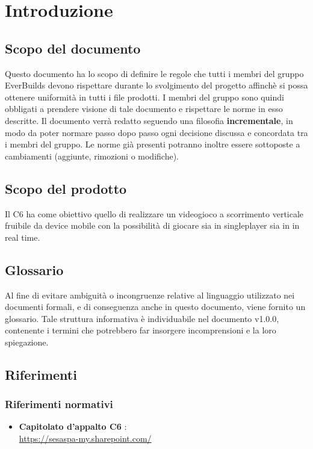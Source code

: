 \section{Introduzione}
    \subsection{Scopo del documento}
        Questo documento ha lo scopo di definire le regole che tutti i membri del gruppo EverBuilds devono rispettare durante lo svolgimento del progetto affinchè si possa ottenere uniformità in tutti i file prodotti.
        I membri del gruppo sono quindi obbligati a prendere visione di tale documento e rispettare le norme in esso descritte.
        Il documento verrà redatto seguendo una filosofia \textbf{incrementale}, in modo da poter normare passo dopo passo ogni decisione discussa e concordata tra i membri del gruppo. Le norme già presenti potranno inoltre essere sottoposte a cambiamenti (aggiunte, rimozioni o modifiche).
    \subsection{Scopo del prodotto}
        Il  C6 ha come obiettivo quello di realizzare un videogioco a scorrimento verticale fruibile da device mobile con la possibilità di giocare sia in singleplayer sia in  in real time. 
    \subsection{Glossario}
        Al fine di evitare ambiguità o incongruenze relative al linguaggio utilizzato nei documenti formali, e di conseguenza anche in questo documento, viene fornito un glossario. Tale struttura informativa è individuabile nel documento  v1.0.0, contenente i termini che potrebbero far insorgere incomprensioni e la loro spiegazione.
    \subsection{Riferimenti}
        \subsubsection{Riferimenti normativi}
            \begin{itemize}
                \item\textbf{Capitolato d'appalto C6} : \\
                \href{https://sesaspa-my.sharepoint.com/personal/s_dindo_vargroup_it/_layouts/15/onedrive.aspx?id=\%2Fpersonal\%2Fs\%5Fdindo\%5Fvargroup\%5Fit\%2FDocuments\%2FDownload\%2Fupload\%2FIngegneria\%5Fsoftware\%2FCapitolato\%5FIngegneria\%5Fsoftware\%2Epdf&parent=\%2Fpersonal\%2Fs\%5Fdindo\%5Fvargroup\%5Fit\%2FDocuments\%2FDownload\%2Fupload\%2FIngegneria\%5Fsoftware&originalPath=aHR0cHM6Ly9zZXNhc3BhLW15LnNoYXJlcG9pbnQuY29tLzpiOi9nL3BlcnNvbmFsL3NfZGluZG9fdmFyZ3JvdXBfaXQvRVRodmF5MGY2S1ZDb1h5ZFlPY2UybGtCdC1NWWNuVzF5YWZSWEZYVklPSXNIZz9ydGltZT13T1VuQ0F5czJFZw }{https://sesaspa-my.sharepoint.com/}
            \end{itemize}
